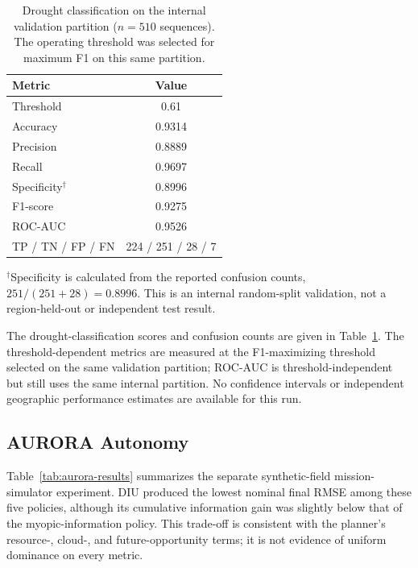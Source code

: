 \documentclass[11pt,a4paper]{article}
\begin{document}
\begin{table}[!htbp]
\centering
\caption{Drought classification on the internal validation partition
($n=510$ sequences). The operating threshold was selected for maximum
F1 on this same partition.}
\label{tab:drought-validation}
\begin{tabular}{lc}
\toprule
Metric & Value\\
\midrule
Threshold & 0.61\\
Accuracy & 0.9314\\
Precision & 0.8889\\
Recall & 0.9697\\
Specificity$^\dagger$ & 0.8996\\
F1-score & 0.9275\\
ROC-AUC & 0.9526\\
TP / TN / FP / FN & 224 / 251 / 28 / 7\\
\bottomrule
\end{tabular}
\vspace{1mm}

\parbox{0.9\linewidth}{\footnotesize $^\dagger$Specificity is
calculated from the reported confusion counts,
$251/(251+28)=0.8996$. This is an internal random-split validation,
not a region-held-out or independent test result.}
\end{table}

The drought-classification scores and confusion counts are given in
Table~\ref{tab:drought-validation}. The threshold-dependent metrics
are measured at the F1-maximizing threshold selected on the same
validation partition; ROC-AUC is threshold-independent but still uses
the same internal partition. No confidence intervals or independent
geographic performance estimates are available for this run.

\subsection{AURORA Autonomy}

Table~\ref{tab:aurora-results} summarizes the separate synthetic-field
mission-simulator experiment. DIU produced the lowest nominal final
RMSE among these five policies, although its cumulative information
gain was slightly below that of the myopic-information policy. This
trade-off is consistent with the planner's resource-, cloud-, and
future-opportunity terms; it is not evidence of uniform dominance on
every metric.
\end{document}
